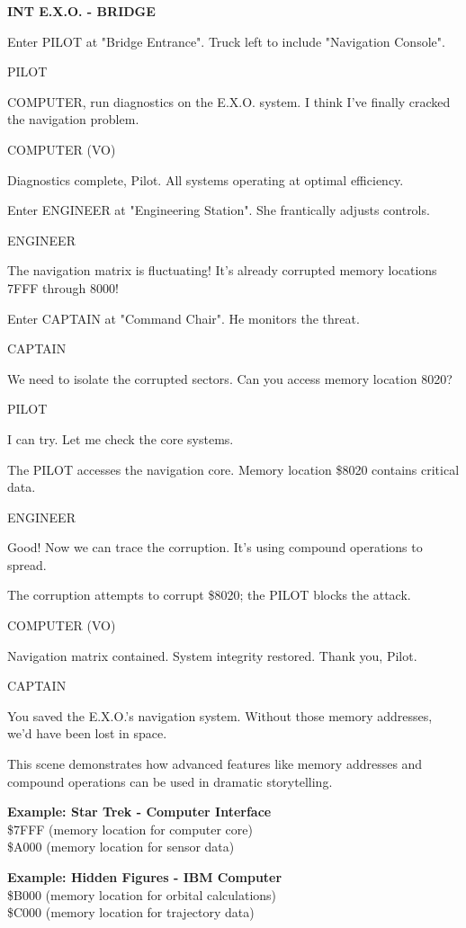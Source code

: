 \documentclass[11pt,letterpaper,oldstylefigures]{memoir}
\newcommand{\slugline}[1]{\nobreak\textbf{\MakeUppercase{#1}}\par\nobreak\vspace{1\baselineskip}}
\newcommand{\speaker}[1]{\nobreak\hspace*{0.333\textwidth}\MakeUppercase{#1}\par\nobreak\vspace{0.5\baselineskip}}
\newcommand{\dialogue}[1]{\nobreak\hspace*{0.25\textwidth}\begin{minipage}{0.5\textwidth}#1\end{minipage}\par\vspace{1\baselineskip}}
\newcommand{\stagedir}[1]{#1\par\vspace{1\baselineskip}}
\newenvironment{FountainExample}
  {\begingroup
  \ttfamily\small
   \setlength{\parindent}{0pt}
  \setlength{\parskip}{0.5em}
  \allowdisplaybreaks
  \setlength{\displaywidowpenalty}{0}
  \setlength{\widowpenalty}{0}
  \setlength{\clubpenalty}{0}
  \setlength{\interlinepenalty}{0}
}
  {\endgroup}
\begin{document}
\begin{FountainExample}
\slugline{INT E.X.O. - BRIDGE}

\stagedir{Enter PILOT at "Bridge Entrance". Truck left to include "Navigation Console".}

\speaker{PILOT}
\dialogue{COMPUTER, run diagnostics on the E.X.O. system. I think I've finally cracked the navigation problem.}

\speaker{COMPUTER (VO)}
\dialogue{Diagnostics complete, Pilot. All systems operating at optimal efficiency.}

\stagedir{Enter ENGINEER at "Engineering Station". She frantically adjusts controls.}

\speaker{ENGINEER}
\dialogue{The navigation matrix is fluctuating! It's already corrupted memory locations 7FFF through 8000!}

\stagedir{Enter CAPTAIN at "Command Chair". He monitors the threat.}

\speaker{CAPTAIN}
\dialogue{We need to isolate the corrupted sectors. Can you access memory location 8020?}

\speaker{PILOT}
\dialogue{I can try. Let me check the core systems.}

\stagedir{The PILOT accesses the navigation core. Memory location \$8020 contains critical data.}

\speaker{ENGINEER}
\dialogue{Good! Now we can trace the corruption. It's using compound operations to spread.}

\stagedir{The corruption attempts to corrupt \$8020; the PILOT blocks the attack.}

\speaker{COMPUTER (VO)}
\dialogue{Navigation matrix contained. System integrity restored. Thank you, Pilot.}

\speaker{CAPTAIN}
\dialogue{You saved the E.X.O.'s navigation system. Without those memory addresses, we'd have been lost in space.}
\end{FountainExample}

This scene demonstrates how advanced features like memory addresses and compound operations can be used in dramatic storytelling.

\textbf{Example: Star Trek - Computer Interface}\\
\$7FFF (memory location for computer core)\\
\$A000 (memory location for sensor data)

\textbf{Example: Hidden Figures - IBM Computer}\\
\$B000 (memory location for orbital calculations)\\
\$C000 (memory location for trajectory data)
\end{document}
